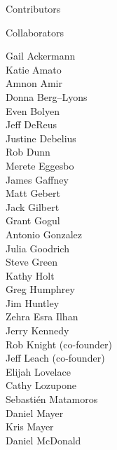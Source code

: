 \documentclass[10pt,letterpaper]{article}
\begin{document}
\colorbox{agpGray}{\parbox{0.36\textwidth}{\vspace{1mm} \large \centering Contributors \vspace{1mm}}}
\hspace{1mm}
\colorbox{agpGray}{\parbox{0.623\textwidth}{\vspace{1mm} \large \centering Collaborators \vspace{1mm}}}

\parbox[t]{0.17\textwidth}{
\scriptsize{
Gail Ackermann\\
Katie Amato\\
Amnon Amir\\
Donna Berg--Lyons\\
Even Bolyen\\
Jeff DeReus\\
Justine Debelius\\
Rob Dunn\\
Merete Eggesbo\\
James Gaffney\\
Matt Gebert\\
Jack Gilbert\\
Grant Gogul\\
Antonio Gonzalez\\
Julia Goodrich\\
Steve Green\\
Kathy Holt\\
Greg Humphrey\\
Jim Huntley\\
Zehra Esra Ilhan\\
Jerry Kennedy\\
Rob Knight (co-founder)\\
Jeff Leach (co-founder)\\
Elijah Lovelace\\
Cathy Lozupone\\
Sebasti\'en Matamoros\\
Daniel Mayer\\
Kris Mayer\\
Daniel McDonald\\
}
}
\hspace{1mm}
\end{document}
